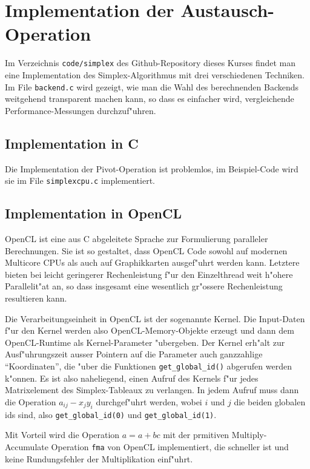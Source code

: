 \section{Implementation der Austausch-Operation}
Im Verzeichnis {\tt code/simplex} des Github-Repository
dieses Kurses findet man eine Implementation
des Simplex-Algorithmus mit drei verschiedenen Techniken.
Im File {\tt backend.c} wird gezeigt, wie man die Wahl des berechnenden
Backends weitgehend transparent machen kann, so dass es einfacher wird,
vergleichende Performance-Messungen durchzuf"uhren.

\subsection{Implementation in C}
Die Implementation der Pivot-Operation ist problemlos, im Beispiel-Code
wird sie im File {\tt simplexcpu.c} implementiert.

\subsection{Implementation in OpenCL}
OpenCL ist eine aus C abgeleitete Sprache zur Formulierung paralleler
Berechnungen. Sie ist so gestaltet, dass OpenCL Code sowohl auf 
modernen Multicore CPUs als auch auf Graphikkarten ausgef"uhrt
werden kann. Letztere bieten bei leicht geringerer
Rechenleistung f"ur den Einzelthread weit h"ohere Parallelit"at an,
so dass insgesamt eine wesentlich gr"ossere Rechenleistung resultieren kann.

Die Verarbeitungseinheit in OpenCL ist der sogenannte Kernel.
Die Input-Daten f"ur den Kernel werden also OpenCL-Memory-Objekte
erzeugt und dann dem OpenCL-Runtime als Kernel-Parameter "ubergeben.
Der Kernel erh"alt zur Ausf"uhrungszeit ausser Pointern auf die 
Parameter auch ganzzahlige ``Koordinaten'', die "uber die
Funktionen \verb+get_global_id()+ abgerufen werden k"onnen.
Es ist also naheliegend, einen Aufruf des Kernels f"ur jedes
Matrixelement des Simplex-Tableaux zu verlangen. In jedem
Aufruf muss dann die Operation $a_{ij}-x_jy_i$
durchgef"uhrt werden, wobei $i$ und $j$ die beiden
globalen ids sind, also
\verb+get_global_id(0)+ und
\verb+get_global_id(1)+.

Mit Vorteil wird die Operation $a=a+bc$ mit der prmitiven Multiply-Accu\-mulate
Operation {\tt fma} von OpenCL implementiert, die schneller ist und
keine Rundungsfehler der Multiplikation einf"uhrt.

